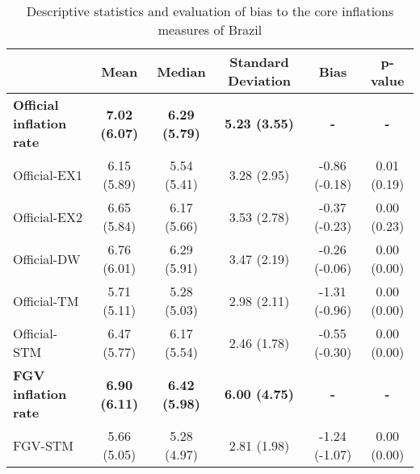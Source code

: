 \documentclass[10pt]{article}
\begin{document}


\begin{table}[h]
\centering
\caption{Descriptive statistics and evaluation of bias to the core inflations measures of Brazil}\label{descritiva_nucleos}
\begin{threeparttable}
\begin{tabular}{@{}l|ccccc@{}}
\toprule
\textbf{}                        & \textbf{Mean} & \textbf{Median}      & \textbf{Standard Deviation}   & \textbf{Bias}  & \textbf{p-value}\\ \midrule
\textbf{Official inflation rate} & \textbf{7.02 (6.07)} & \textbf{6.29 (5.79)}  & \textbf{5.23 (3.55)}     & \textbf{-}     & \textbf{-}      \\ 
Official-EX1                     & 6.15 (5.89)          & 5.54 (5.41)           & 3.28 (2.95)              & -0.86 (-0.18)  & 0.01 (0.19) \\
Official-EX2                     & 6.65 (5.84)          & 6.17 (5.66)           & 3.53 (2.78)              & -0.37 (-0.23)  & 0.00 (0.23) \\
Official-DW                      & 6.76 (6.01)          & 6.29 (5.91)           & 3.47 (2.19)              & -0.26 (-0.06)  & 0.00 (0.00) \\
Official-TM                      & 5.71 (5.11)          & 5.28 (5.03)           & 2.98 (2.11)              & -1.31 (-0.96)  & 0.00 (0.00) \\
Official-STM                     & 6.47 (5.77)          & 6.17 (5.54)           & 2.46 (1.78)              & -0.55 (-0.30)  & 0.00 (0.00) \\ \midrule
\textbf{FGV inflation rate}      & \textbf{6.90 (6.11)} & \textbf{6.42 (5.98)} & \textbf{6.00 (4.75)}     & \textbf{-}      & \textbf{-}  \\ 
FGV-STM                          & 5.66 (5.05)          & 5.28 (4.97)            & 2.81 (1.98)              & -1.24 (-1.07) & 0.00 (0.00) \\ \bottomrule

\end{tabular}
\end{threeparttable}
\end{table}
\end{document}
